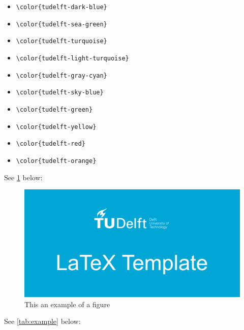 \begin{itemize}
    \item {\color{tudelft-dark-blue}\verb|\color{tudelft-dark-blue}|}
    \item {\color{tudelft-sea-green}\verb|\color{tudelft-sea-green}|}
    \item {\color{tudelft-turquoise}\verb|\color{tudelft-turquoise}|}
    \item {\color{tudelft-light-turquoise}\verb|\color{tudelft-light-turquoise}|}
    \item {\color{tudelft-gray-cyan}\verb|\color{tudelft-gray-cyan}|}
    \item {\color{tudelft-sky-blue}\verb|\color{tudelft-sky-blue}|}
    \item {\color{tudelft-green}\verb|\color{tudelft-green}|}
    \item {\color{tudelft-yellow}\verb|\color{tudelft-yellow}|}
    \item {\color{tudelft-red}\verb|\color{tudelft-red}|}
    \item {\color{tudelft-orange}\verb|\color{tudelft-orange}|}
\end{itemize}


See \cref{fig:example} below:

\begin{figure}[H]
    \includegraphics[width=\textwidth]{GitHub_repo_card.png}
    \caption{This an example of a figure}
    \label{fig:example}
\end{figure}


See \cref{tab:example} below:

